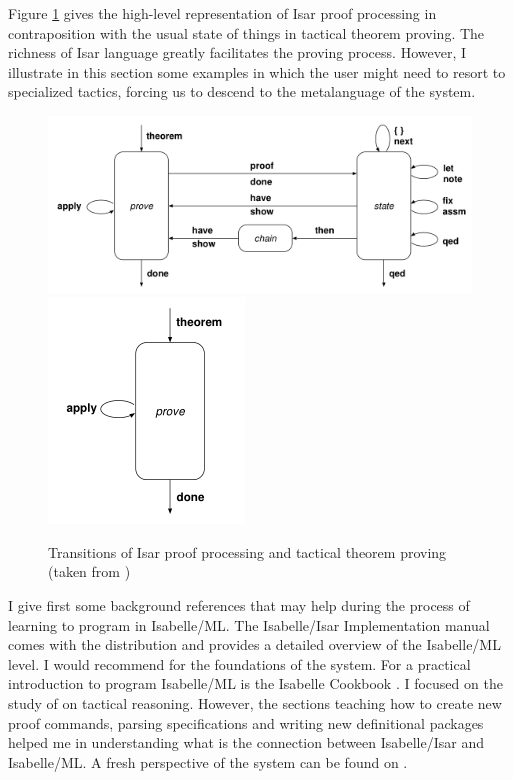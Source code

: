 \documentclass[notitlepage]{article}
\begin{document}
Figure \ref{fig:isar} gives the high-level representation of Isar proof processing in contraposition with the usual state of things in tactical theorem proving. The richness of Isar language greatly facilitates the proving process. However, I illustrate in this section some examples in which the user might need to resort to specialized tactics, forcing us to descend to the metalanguage of the system. 

\begin{figure}
	\includegraphics[scale=0.65]{img/isar.png} 
	\includegraphics[scale=0.65]{img/tactics.png}
	\caption{Transitions of Isar proof processing and tactical theorem proving (taken from \cite{wenzel2002isabelle})}
	\label{fig:isar}
\end{figure}

I give first some background references that may help during the process of learning to program in Isabelle/ML. The Isabelle/Isar Implementation manual comes with the distribution and provides a detailed overview of the Isabelle/ML level. I would recommend \cite{wenzel2002isabelle} for the foundations of the system. For a practical introduction to program Isabelle/ML is the Isabelle Cookbook \cite{cookbook}. I focused on the study of on tactical reasoning. However, the sections teaching how to create new proof commands, parsing specifications and writing new definitional packages helped me in understanding what is the connection between Isabelle/Isar and Isabelle/ML. A fresh perspective of the system can be found on \cite{wolff2019my}.
\end{document}
